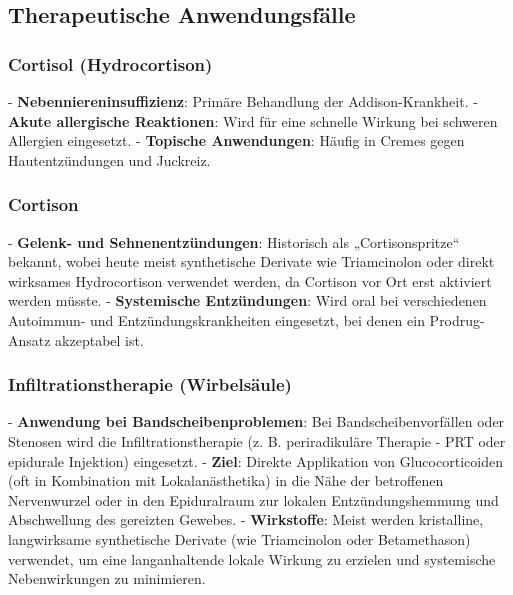 \documentclass{article}
\begin{document}
\subsection{Therapeutische Anwendungsfälle}
\subsubsection{Cortisol (Hydrocortison)}
- \textbf{Nebenniereninsuffizienz}: Primäre Behandlung der Addison-Krankheit.
- \textbf{Akute allergische Reaktionen}: Wird für eine schnelle Wirkung bei schweren Allergien eingesetzt.
- \textbf{Topische Anwendungen}: Häufig in Cremes gegen Hautentzündungen und Juckreiz.

\subsubsection{Cortison}
- \textbf{Gelenk- und Sehnenentzündungen}: Historisch als „Cortisonspritze“ bekannt, wobei heute meist synthetische Derivate wie Triamcinolon oder direkt wirksames Hydrocortison verwendet werden, da Cortison vor Ort erst aktiviert werden müsste.
- \textbf{Systemische Entzündungen}: Wird oral bei verschiedenen Autoimmun- und Entzündungskrankheiten eingesetzt, bei denen ein Prodrug-Ansatz akzeptabel ist.

\subsubsection{Infiltrationstherapie (Wirbelsäule)}
- \textbf{Anwendung bei Bandscheibenproblemen}: Bei Bandscheibenvorfällen oder Stenosen wird die Infiltrationstherapie (z. B. periradikuläre Therapie - PRT oder epidurale Injektion) eingesetzt.
- \textbf{Ziel}: Direkte Applikation von Glucocorticoiden (oft in Kombination mit Lokalanästhetika) in die Nähe der betroffenen Nervenwurzel oder in den Epiduralraum zur lokalen Entzündungshemmung und Abschwellung des gereizten Gewebes.
- \textbf{Wirkstoffe}: Meist werden kristalline, langwirksame synthetische Derivate (wie Triamcinolon oder Betamethason) verwendet, um eine langanhaltende lokale Wirkung zu erzielen und systemische Nebenwirkungen zu minimieren.
\end{document}
